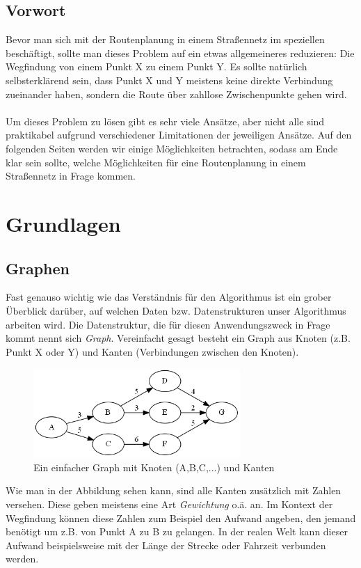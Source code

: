 \documentclass[11pt]{scrreprt}
\begin{document}
	\section{Vorwort}
	Bevor man sich mit der Routenplanung in einem Straßennetz im speziellen beschäftigt, sollte man dieses Problem auf ein etwas allgemeineres reduzieren: Die Wegfindung von einem Punkt X zu einem Punkt Y.
	Es sollte natürlich selbsterklärend sein, dass Punkt X und Y meistens keine direkte Verbindung zueinander haben, sondern die Route über zahllose Zwischenpunkte gehen wird.
	\\\\
	Um dieses Problem zu lösen gibt es sehr viele Ansätze, aber nicht alle sind praktikabel aufgrund verschiedener Limitationen der jeweiligen Ansätze.
	Auf den folgenden Seiten werden wir einige Möglichkeiten betrachten, sodass am Ende klar sein sollte, welche Möglichkeiten für eine Routenplanung in einem Straßennetz in Frage kommen.

\chapter{Grundlagen}
	\section{Graphen}
	Fast genauso wichtig wie das Verständnis für den Algorithmus ist ein grober Überblick darüber, auf welchen Daten bzw. Datenstrukturen unser Algorithmus arbeiten wird.
	Die Datenstruktur, die für diesen Anwendungszweck in Frage kommt nennt sich \textit{Graph}.
	Vereinfacht gesagt besteht ein Graph aus Knoten (z.B. Punkt X oder Y) und Kanten (Verbindungen zwischen den Knoten). \cite{wiki:german:graphs}

	\begin{figure}[ht]
		\centering
		\includegraphics[width=0.7\textwidth]{Graphs/hello}
		\caption{Ein einfacher Graph mit Knoten (A,B,C,...) und Kanten}
	\end{figure}

	Wie man in der Abbildung sehen kann, sind alle Kanten zusätzlich mit Zahlen versehen. Diese geben meistens eine Art \textit{Gewichtung} o.ä. an. Im Kontext der Wegfindung können diese Zahlen zum Beispiel den Aufwand angeben, den jemand benötigt um z.B. von Punkt A zu B zu gelangen. In der realen Welt kann dieser Aufwand beispielsweise mit der Länge der Strecke oder Fahrzeit verbunden werden.
	\newpage
\end{document}
